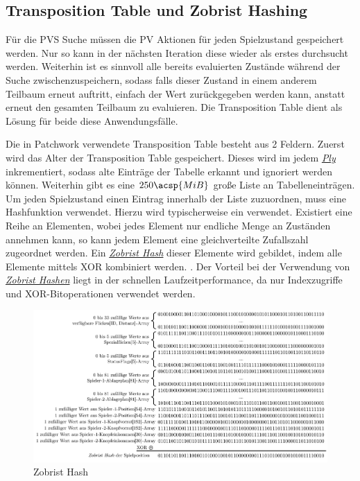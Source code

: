 \subsection{Transposition Table und Zobrist Hashing}

Für die \ac{PVS} Suche müssen die \ac{PV} Aktionen für jeden Spielzustand gespeichert werden. Nur so kann in der nächsten Iteration diese wieder als erstes durchsucht werden. Weiterhin ist es sinnvoll alle bereits evaluierten Zustände während der Suche zwischenzuspeichern, sodass falls dieser Zustand in einem anderem Teilbaum erneut auftritt, einfach der Wert zurückgegeben werden kann, anstatt erneut den gesamten Teilbaum zu evaluieren. Die Transposition Table dient als Lösung für beide diese Anwendungsfälle.

Die in Patchwork verwendete Transposition Table besteht aus 2 Feldern. Zuerst wird das Alter der Transposition Table gespeichert. Dieses wird im jedem \hyperref[text:ply]{\emph{Ply}} inkrementiert, sodass alte Einträge der Tabelle erkannt und ignoriert werden können. Weiterhin gibt es eine $250\acsp{MiB}$ große Liste an Tabelleneinträgen. Um jeden Spielzustand einen Eintrag innerhalb der Liste zuzuordnen, muss eine Hashfunktion verwendet. Hierzu wird typischerweise ein  verwendet. Existiert eine Reihe an Elementen, wobei jedes Element nur endliche Menge an Zuständen annehmen kann, so kann jedem Element eine gleichverteilte Zufallszahl zugeordnet werden. Ein \hyperref[text:zobrist-hash]{\emph{Zobrist Hash}} dieser Elemente wird gebildet, indem alle Elemente mittels \ac{XOR} kombiniert werden. \cite[S. 3]{1990.ZobristHash}. Der Vorteil bei der Verwendung von \hyperref[text:zobrist-hash]{\emph{Zobrist Hashen}}  liegt in der schnellen Laufzeitperformance, da nur Indexzugriffe und \ac{XOR}-Bitoperationen verwendet werden.

\vspace*{-0.09cm}

\begin{figure}[!ht]
    \centering
    \includegraphics[width=\textwidth]{res/pictures/zobrist-hash.pdf}
    \vspace*{-0.35cm}
    \caption{Zobrist Hash}
    \label{fig:zobrist-hash}
\end{figure}

